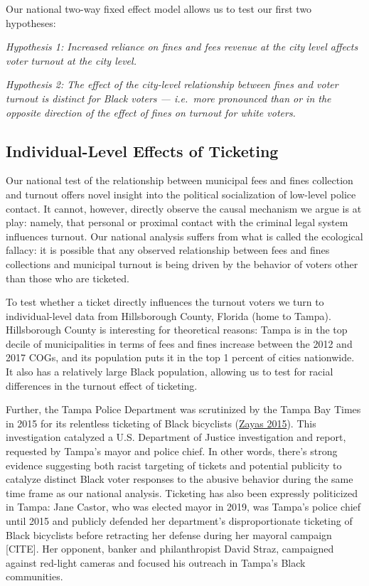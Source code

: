 \documentclass[
  12pt,
]{article}
\begin{document}
Our national two-way fixed effect model allows us to test our first two hypotheses:

\emph{Hypothesis 1: Increased reliance on fines and fees revenue at the city level affects voter turnout at the city level.}

\emph{Hypothesis 2: The effect of the city-level relationship between fines and voter turnout is distinct for Black voters --- i.e.~more pronounced than or in the opposite direction of the effect of fines on turnout for white voters.}

\hypertarget{individual-level-effects-of-ticketing}{%
\subsection*{Individual-Level Effects of Ticketing}\label{individual-level-effects-of-ticketing}}

Our national test of the relationship between municipal fees and fines collection and turnout offers novel insight into the political socialization of low-level police contact. It cannot, however, directly observe the causal mechanism we argue is at play: namely, that personal or proximal contact with the criminal legal system influences turnout. Our national analysis suffers from what is called the ecological fallacy: it is possible that any observed relationship between fees and fines collections and municipal turnout is being driven by the behavior of voters other than those who are ticketed.

To test whether a ticket directly influences the turnout voters we turn to individual-level data from Hillsborough County, Florida (home to Tampa). Hillsborough County is interesting for theoretical reasons: Tampa is in the top decile of municipalities in terms of fees and fines increase between the 2012 and 2017 COGs, and its population puts it in the top 1 percent of cities nationwide. It also has a relatively large Black population, allowing us to test for racial differences in the turnout effect of ticketing.

Further, the Tampa Police Department was scrutinized by the Tampa Bay Times in 2015 for its relentless ticketing of Black bicyclists (\protect\hyperlink{ref-Zayas2015}{Zayas 2015}). This investigation catalyzed a U.S. Department of Justice investigation and report, requested by Tampa's mayor and police chief. In other words, there's strong evidence suggesting both racist targeting of tickets and potential publicity to catalyze distinct Black voter responses to the abusive behavior during the same time frame as our national analysis. Ticketing has also been expressly politicized in Tampa: Jane Castor, who was elected mayor in 2019, was Tampa's police chief until 2015 and publicly defended her department's disproportionate ticketing of Black bicyclists before retracting her defense during her mayoral campaign {[}CITE{]}. Her opponent, banker and philanthropist David Straz, campaigned against red-light cameras and focused his outreach in Tampa's Black communities.
\end{document}
